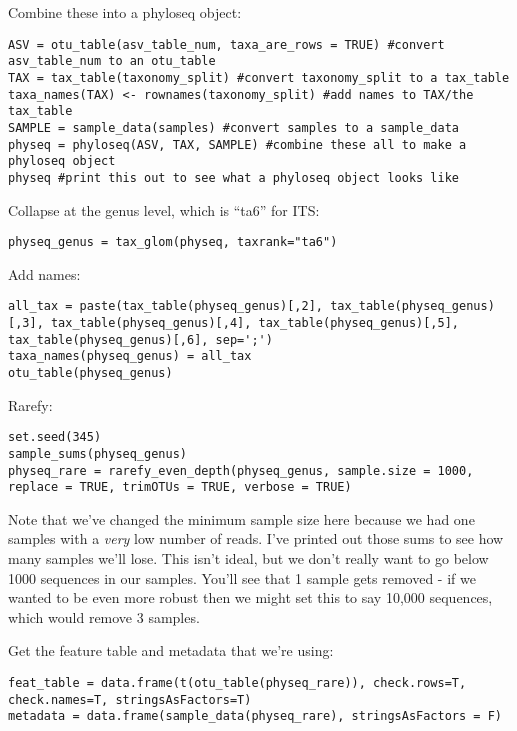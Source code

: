 \documentclass[
]{book}
\begin{document}
Combine these into a phyloseq object:

\begin{verbatim}
ASV = otu_table(asv_table_num, taxa_are_rows = TRUE) #convert asv_table_num to an otu_table
TAX = tax_table(taxonomy_split) #convert taxonomy_split to a tax_table
taxa_names(TAX) <- rownames(taxonomy_split) #add names to TAX/the tax_table
SAMPLE = sample_data(samples) #convert samples to a sample_data
physeq = phyloseq(ASV, TAX, SAMPLE) #combine these all to make a phyloseq object
physeq #print this out to see what a phyloseq object looks like
\end{verbatim}

Collapse at the genus level, which is ``ta6'' for ITS:

\begin{verbatim}
physeq_genus = tax_glom(physeq, taxrank="ta6")
\end{verbatim}

Add names:

\begin{verbatim}
all_tax = paste(tax_table(physeq_genus)[,2], tax_table(physeq_genus)[,3], tax_table(physeq_genus)[,4], tax_table(physeq_genus)[,5], tax_table(physeq_genus)[,6], sep=';')
taxa_names(physeq_genus) = all_tax
otu_table(physeq_genus)
\end{verbatim}

Rarefy:

\begin{verbatim}
set.seed(345)
sample_sums(physeq_genus)
physeq_rare = rarefy_even_depth(physeq_genus, sample.size = 1000, replace = TRUE, trimOTUs = TRUE, verbose = TRUE)
\end{verbatim}

Note that we've changed the minimum sample size here because we had one samples with a \emph{very} low number of reads. I've printed out those sums to see how many samples we'll lose. This isn't ideal, but we don't really want to go below 1000 sequences in our samples. You'll see that 1 sample gets removed - if we wanted to be even more robust then we might set this to say 10,000 sequences, which would remove 3 samples.

Get the feature table and metadata that we're using:

\begin{verbatim}
feat_table = data.frame(t(otu_table(physeq_rare)), check.rows=T, check.names=T, stringsAsFactors=T)
metadata = data.frame(sample_data(physeq_rare), stringsAsFactors = F)
\end{verbatim}
\end{document}

